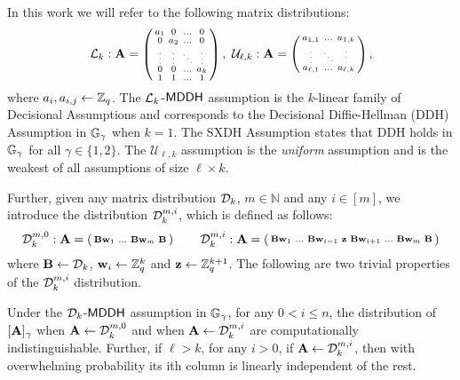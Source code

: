 In this work we will refer to the following matrix distributions: 
\[
\distlin_{k}:\matrA = \left( \begin{smallmatrix}
    a_1 & 0 &  \ldots & 0 \\
    0 &  a_2 &  \ldots & 0\\
    \tiny{\vdots} &  \tiny{\vdots}  &  \tiny{\ddots} & \tiny{\vdots} \\
    0 & 0 &  \ldots  & a_{k}\\
    1 & 1 & \ldots & 1
\end{smallmatrix} \right),
\ 
\mathcal{U}_{\ell,k}: \matrA = \left( \begin{smallmatrix}
    a_{1,1} &  \ldots & a_{1,k}  \\
    \tiny{\vdots} & \tiny{\ddots}  & \tiny{\vdots} \\
    a_{\ell,1} &  \ldots &  a_{\ell,k} 
\end{smallmatrix} \right),
\]
where $a_i,a_{i,j}\leftarrow \mathbb{Z}_q$.  The $\mathcal{L}_{k}$-$\mathsf{MDDH}$ assumption is the $k$-linear family of Decisional Assumptions
and corresponds to 
 the Decisional Diffie-Hellman (DDH)
Assumption in $\mathbb{G}_\gamma$ when $k=1$. The SXDH Assumption states that DDH holds in $\mathbb{G}_\gamma$ for all $\gamma \in \{1,2\}$. The $\mathcal{U}_{\ell,k}$ assumption is the \textit{uniform} assumption and is the weakest of all assumptions of size $\ell \times k$. 

Further, given any matrix distribution $\mathcal{D}_{k}$, $m \in \mathbb{N}$ and any $i \in [m]$, we introduce the distribution $\mathcal{D}_k^{m,i}$, which is defined as follows: 
\[ \mathcal{D}_k^{m,0}: \mathbf{{A}} = \left(\begin{smallmatrix} \mathbf{{B}}\mathbf{w}_1 & \ldots &  
  \mathbf{{B}}\mathbf{w}_{m} & \mathbf{{B}}  \end{smallmatrix} \right)  \qquad
\mathcal{D}_k^{m,i}:\mathbf{{A}} = \left(\begin{smallmatrix} \mathbf{{B}}\mathbf{w}_1 & \ldots & \mathbf{{B}}\mathbf{w}_{i-1} 
& \mathbf{z} &  \mathbf{{B}}\mathbf{w}_{i+1} & \ldots &  
  \mathbf{{B}}\mathbf{w}_{m} & \mathbf{{B}}  \end{smallmatrix} \right) 
\]
where $\mathbf{{B}} \leftarrow \mathcal{D}_{k}$, $\mathbf{w}_i \leftarrow \mathbb{Z}_q^k$ and $\mathbf{z} \leftarrow \mathbb{Z}_q^{k+1}$. The following are two trivial properties of the $\mathcal{D}_k^{m,i}$ distribution. 

\begin{lemma} Under the $\mathcal{D}_{k}$-$\mathsf{MDDH}$ assumption in $\mathbb{G}_\gamma$, for any $0 < i \leq n$, the distribution of  $[\mathbf{{A}}]_\gamma$ when $\mathbf{{A}} \leftarrow \mathcal{D}_k^{m,0}$ and when $\mathbf{{A}} \leftarrow \mathcal{D}_k^{m,i}$ are computationally indistinguishable. Further, if $\ell>k$, for any $i>0$, if $\mathbf{{A}} \leftarrow \mathcal{D}_k^{m,i}$, then with overwhelming probability its ith column is linearly independent of the rest. \label{lemma:dist-i}
\end{lemma}

